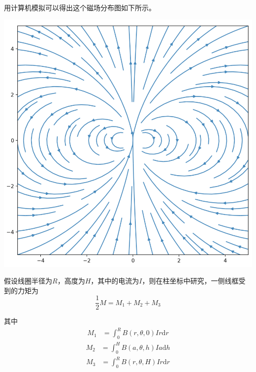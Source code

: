 \documentclass{CLGPY}
\begin{document}
\begin{multicols}{1}
用计算机模拟可以得出这个磁场分布图如下所示。
        \begin{center}
            \includegraphics[scale=.2]{./fig/20210615122737.png}
        \end{center}


假设线圈半径为$R$，高度为$H$，其中的电流为$I$，则在柱坐标中研究，一侧线框受到的力矩为
\begin{equation}
\frac{1}{2}M=M_1+M_2+M_3
\end{equation}

其中
\begin{equation}
\begin{aligned}
M_{1} &=\int_{0}^{R} B(r, \theta, 0) I r \mathrm{d} r
\end{aligned}
\end{equation}
\begin{equation}
\begin{aligned}
M_{2} &=\int_{0}^{H} B(a, \theta, h) I a \mathrm{d} h 
\end{aligned}
\end{equation}
\begin{equation}
\begin{aligned}
M_{3} &=\int_{0}^{R} B(r, \theta, H) I r \mathrm{d} r
\end{aligned}
\end{equation}


\end{multicols}
\end{document}
